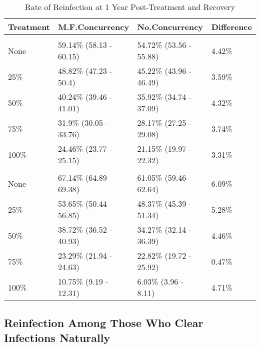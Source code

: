 \documentclass [11pt, proquest] {uwthesis}[2015/03/03]
\begin{document}
\begin{table}

\caption{\label{tab:reinf12}Rate of Reinfection at 1 Year Post-Treatment and Recovery}
\centering
\begin{tabular}[t]{llll}
\toprule
Treatment & M.F.Concurrency & No.Concurrency & Difference\\
\midrule
\addlinespace[0.3em]
\multicolumn{4}{l}{\textbf{Females}}\\
\hspace{1em}None & 59.14\% (58.13 - 60.15) & 54.72\% (53.56 - 55.88) & 4.42\%\\
\hspace{1em}25\% & 48.82\% (47.23 - 50.4) & 45.22\% (43.96 - 46.49) & 3.59\%\\
\hspace{1em}50\% & 40.24\% (39.46 - 41.01) & 35.92\% (34.74 - 37.09) & 4.32\%\\
\hspace{1em}75\% & 31.9\% (30.05 - 33.76) & 28.17\% (27.25 - 29.08) & 3.74\%\\
\hspace{1em}100\% & 24.46\% (23.77 - 25.15) & 21.15\% (19.97 - 22.32) & 3.31\%\\
\addlinespace[0.3em]
\multicolumn{4}{l}{\textbf{Males}}\\
\hspace{1em}None & 67.14\% (64.89 - 69.38) & 61.05\% (59.46 - 62.64) & 6.09\%\\
\hspace{1em}25\% & 53.65\% (50.44 - 56.85) & 48.37\% (45.39 - 51.34) & 5.28\%\\
\hspace{1em}50\% & 38.72\% (36.52 - 40.93) & 34.27\% (32.14 - 36.39) & 4.46\%\\
\hspace{1em}75\% & 23.29\% (21.94 - 24.63) & 22.82\% (19.72 - 25.92) & 0.47\%\\
\hspace{1em}100\% & 10.75\% (9.19 - 12.31) & 6.03\% (3.96 - 8.11) & 4.71\%\\
\bottomrule
\end{tabular}
\end{table}
\hypertarget{reinfection-among-those-who-clear-infections-naturally}{%
\subsection{Reinfection Among Those Who Clear Infections Naturally}\label{reinfection-among-those-who-clear-infections-naturally}}
\end{document}
